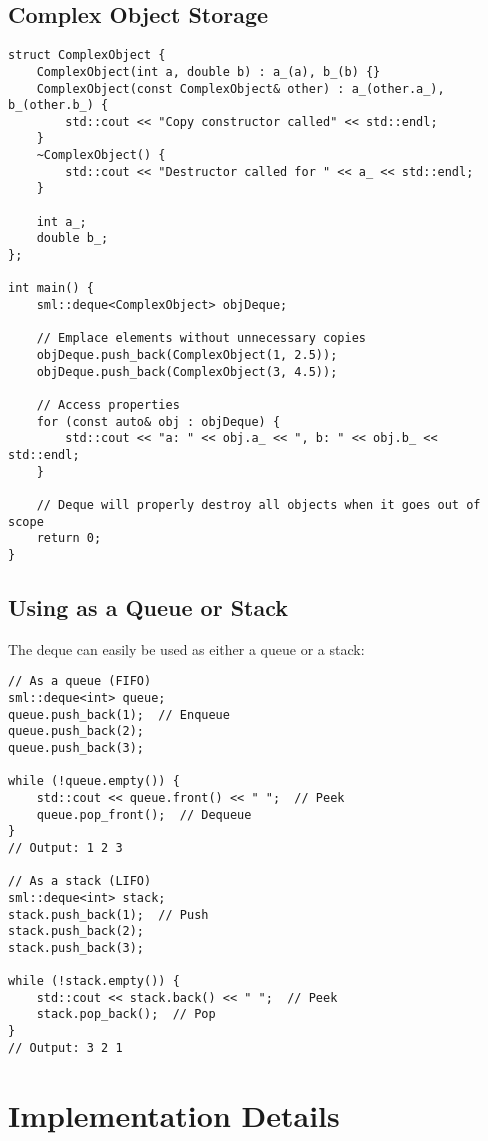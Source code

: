 \documentclass[a4paper,12pt]{article}
\begin{document}
\subsection{Complex Object Storage}
\begin{lstlisting}
struct ComplexObject {
    ComplexObject(int a, double b) : a_(a), b_(b) {}
    ComplexObject(const ComplexObject& other) : a_(other.a_), b_(other.b_) {
        std::cout << "Copy constructor called" << std::endl;
    }
    ~ComplexObject() {
        std::cout << "Destructor called for " << a_ << std::endl;
    }
    
    int a_;
    double b_;
};

int main() {
    sml::deque<ComplexObject> objDeque;
    
    // Emplace elements without unnecessary copies
    objDeque.push_back(ComplexObject(1, 2.5));
    objDeque.push_back(ComplexObject(3, 4.5));
    
    // Access properties
    for (const auto& obj : objDeque) {
        std::cout << "a: " << obj.a_ << ", b: " << obj.b_ << std::endl;
    }
    
    // Deque will properly destroy all objects when it goes out of scope
    return 0;
}
\end{lstlisting}

\subsection{Using as a Queue or Stack}
The deque can easily be used as either a queue or a stack:

\begin{lstlisting}
// As a queue (FIFO)
sml::deque<int> queue;
queue.push_back(1);  // Enqueue
queue.push_back(2);
queue.push_back(3);

while (!queue.empty()) {
    std::cout << queue.front() << " ";  // Peek
    queue.pop_front();  // Dequeue
}
// Output: 1 2 3

// As a stack (LIFO)
sml::deque<int> stack;
stack.push_back(1);  // Push
stack.push_back(2);
stack.push_back(3);

while (!stack.empty()) {
    std::cout << stack.back() << " ";  // Peek
    stack.pop_back();  // Pop
}
// Output: 3 2 1
\end{lstlisting}

\section{Implementation Details}
\end{document}
